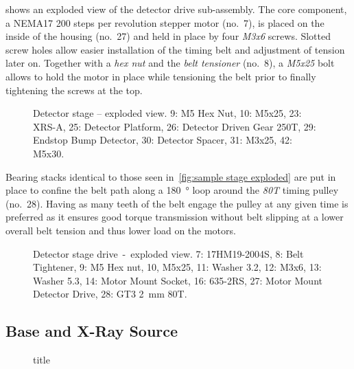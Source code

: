              shows an exploded view of the detector drive sub-assembly.
            The core component, a NEMA17 \num{200} steps per revolution stepper motor (no.~7), is placed on the inside of the housing (no.~27) and held in place by four \textit{M3x6} screws.
            Slotted screw holes allow easier installation of the timing belt and adjustment of tension later on.
            Together with a \textit{hex nut} and the \textit{belt tensioner} (no.~8), a \textit{M5x25} bolt allows to hold the motor in place while tensioning the belt prior to finally tightening the screws at the top.

            \begin{figure}[!h]
                \centering
                \caption[Detector stage -- exploded view]{Detector stage -- exploded view. 9: M5 Hex Nut, 10: M5x25, 23: XRS-A, 25: Detector Platform, 26: Detector Driven Gear 250T, 29: Endstop Bump Detector, 30: Detector Spacer, 31: M3x25, 42: M5x30.}%
                \label{fig:detector stage exploded}%
            \end{figure}
            
            Bearing stacks identical to those seen in~\cref{fig:sample stage exploded} are put in place to confine the belt path along a \qty{180}{\degree} loop around the \textit{80T} timing pulley (no.~28).
            Having as many teeth of the belt engage the pulley at any given time is preferred as it ensures good torque transmission without belt slipping at a lower overall belt tension and thus lower load on the motors.
            \begin{figure}[!h]
                \centering
                
                \caption[Detector stage drive~--~exploded view]{Detector stage drive~-~exploded view. 7: 17HM19-2004S, 8: Belt Tightener, 9: M5 Hex nut, 10, M5x25, 11: Washer 3.2, 12: M3x6, 13: Washer 5.3, 14: Motor Mount Socket, 16: 635-2RS, 27: Motor Mount Detector Drive, 28: GT3 \qty{2}{\milli\meter} 80T.}
                \label{fig:detector drive exploded}
            \end{figure}

        \subsection{Base and X-Ray Source}
            \begin{figure}[!ht]
                \centering
                
                \caption[short]{title}%
                \label{fig:source exploded}
            \end{figure}

